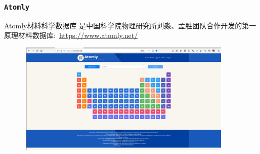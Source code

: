 \frame
{
	\frametitle{\tt{Atomly}}
\textrm{Atomly}材料科学数据库%
是中国科学院物理研究所刘淼、孟胜团队合作开发的第一原理材料数据库:~\url{https://www.atomly.net/}
\begin{figure}[h!]
\centering
\vspace*{-0.1in}
\includegraphics[height=2.1in,width=4.1in,viewport=5 0 1608 830,clip]{Figures/Atomly.png}
\label{Logo_Atomly_lib}
\end{figure} 
}

